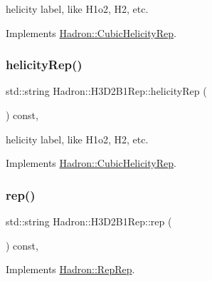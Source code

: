 helicity label, like H1o2, H2, etc. 

Implements \mbox{\hyperlink{structHadron_1_1CubicHelicityRep_af1096946b7470edf0a55451cc662f231}{Hadron\+::\+Cubic\+Helicity\+Rep}}.

\mbox{\label{structHadron_1_1H3D2B1Rep_a3264ff0e5357cfb2c346fa2c8f68cab5}} 
\subsubsection{\texorpdfstring{helicityRep()}{helicityRep()}\hspace{0.1cm}{\footnotesize\ttfamily [2/2]}}
{\footnotesize\ttfamily std\+::string Hadron\+::\+H3\+D2\+B1\+Rep\+::helicity\+Rep (\begin{DoxyParamCaption}{ }\end{DoxyParamCaption}) const\hspace{0.3cm}{\ttfamily [inline]}, {\ttfamily [virtual]}}

helicity label, like H1o2, H2, etc. 

Implements \mbox{\hyperlink{structHadron_1_1CubicHelicityRep_af1096946b7470edf0a55451cc662f231}{Hadron\+::\+Cubic\+Helicity\+Rep}}.

\mbox{\label{structHadron_1_1H3D2B1Rep_a43cf9c155f37ec6e0fa26166cd1a5f2a}} 
\subsubsection{\texorpdfstring{rep()}{rep()}\hspace{0.1cm}{\footnotesize\ttfamily [1/3]}}
{\footnotesize\ttfamily std\+::string Hadron\+::\+H3\+D2\+B1\+Rep\+::rep (\begin{DoxyParamCaption}{ }\end{DoxyParamCaption}) const\hspace{0.3cm}{\ttfamily [inline]}, {\ttfamily [virtual]}}



Implements \mbox{\hyperlink{structHadron_1_1RepRep_ab3213025f6de249f7095892109575fde}{Hadron\+::\+Rep\+Rep}}.

\mbox{\label{structHadron_1_1H3D2B1Rep_a43cf9c155f37ec6e0fa26166cd1a5f2a}} 
